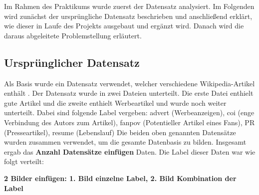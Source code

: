 
Im Rahmen des Praktikums wurde zuerst der Datensatz analysiert. Im Folgenden wird zunächst der ursprüngliche Datensatz beschrieben und anschließend erklärt, wie dieser in Laufe des Projekts ausgebaut und ergänzt wird. Danach wird die daraus abgeleitete Problemstellung erläutert.

\subsection{Ursprünglicher Datensatz}
\label{UrsprunglicherDatensatz}
Als Basis wurde ein Datensatz verwendet, welcher  verschiedene Wikipedia-Artikel enthält \cite{Urbanbricks2020}. Der Datensatz wurde in zwei Dateien unterteilt. Die erste Datei enthielt gute Artikel und die zweite enthielt %
Werbeartikel und wurde noch weiter unterteilt. Dabei sind folgende Label vergeben: advert (Werbeanzeigen), coi (enge Verbindung des Autors zum Artikel), fanpov (Potentieller Artikel eines Fans), PR  (Presseartikel), resume (Lebenslauf)
Die beiden oben genannten Datensätze wurden zusammen verwendet, um die gesamte Datenbasis zu bilden. Insgesamt ergab das \textbf{Anzahl Datensätze einfügen} Daten. Die Label dieser Daten war wie folgt verteilt:


\textbf{2 Bilder einfügen: 1. Bild einzelne Label, 2. Bild Kombination der Label}
\\



